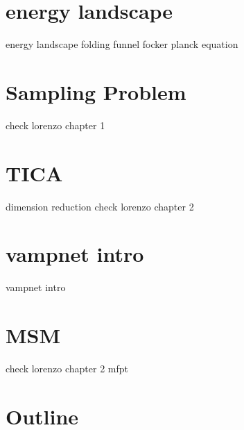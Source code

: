 \section{energy landscape }
energy landscape 
folding funnel
focker planck equation
\section{Sampling Problem}
check  lorenzo chapter 1

\section{TICA}
dimension reduction
check  lorenzo chapter 2

\section{vampnet intro}
vampnet intro

\section{MSM}
check  lorenzo chapter 2
mfpt

\section{Outline}